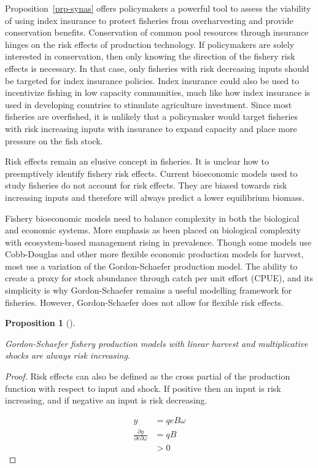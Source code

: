\documentclass[
  letterpaper,
  DIV=11,
  numbers=noendperiod]{scrartcl}
\theoremstyle{plain}
\theoremstyle{plain}
\newtheorem{proposition}{Proposition}[section]
\theoremstyle{remark}
\begin{document}
Proposition~\ref{prp-synas} offers policymakers a powerful tool to
assess the viability of using index insurance to protect fisheries from
overharvesting and provide conservation benefits. Conservation of common
pool resources through insurance hinges on the risk effects of
production technology. If policymakers are solely interested in
conservation, then only knowing the direction of the fishery risk
effects is necessary. In that case, only fisheries with risk decreasing
inputs should be targeted for index insurance policies. Index insurance
could also be used to incentivize fishing in low capacity communities,
much like how index insurance is used in developing countries to
stimulate agriculture investment. Since most fisheries are overfished,
it is unlikely that a policymaker would target fisheries with risk
increasing inputs with insurance to expand capacity and place more
pressure on the fish stock.

Risk effects remain an elusive concept in fisheries. It is unclear how
to preemptively identify fishery risk effects. Current bioeconomic
models used to study fisheries do not account for risk effects. They are
biased towards risk increasing inputs and therefore will always predict
a lower equilibrium biomass.

Fishery bioeconomic models need to balance complexity in both the
biological and economic systems. More emphasis as been placed on
biological complexity with ecosystem-based management rising in
prevalence. Though some models use Cobb-Douglas and other more flexible
economic production models for harvest, most use a variation of the
Gordon-Schaefer production model. The ability to create a proxy for
stock abundance through catch per unit effort (CPUE), and its simplicity
is why Gordon-Schaefer remains a useful modelling framework for
fisheries. However, Gordon-Schaefer does not allow for flexible risk
effects.

\begin{proposition}[]\protect\hypertarget{prp-gs}{}\label{prp-gs}

Gordon-Schaefer fishery production models with linear harvest and
multiplicative shocks are always risk increasing.

\end{proposition}

\begin{proof}

Risk effects can also be defined as the cross partial of the production
function with respect to input and shock. If positive then an input is
risk increasing, and if negative an input is risk decreasing.

\[
\begin{aligned}
y&=qeB\omega \\
\frac{\partial y}{\partial e \partial \omega} &=qB \\
&>0
\end{aligned}
\]

\end{proof}
\end{document}
